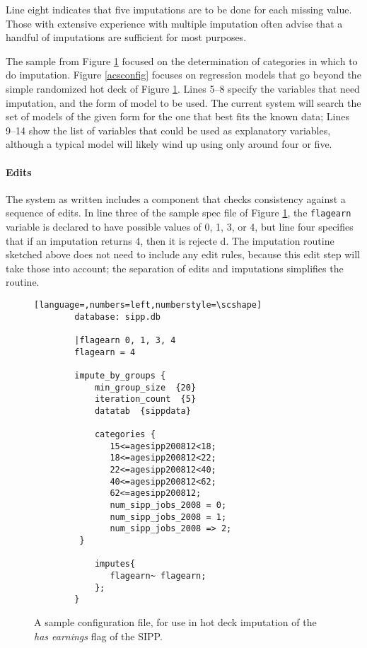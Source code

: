 \documentclass{article}
\begin{document}
        Line eight indicates that five imputations are to be done for each missing
        value. Those with extensive experience with multiple imputation often advise
        that a handful of imputations are sufficient for most purposes.

        The sample from
        Figure \ref{sippconfig} focused on the determination of categories in which to
        do imputation. Figure \ref{acsconfig} focuses on regression models that go
        beyond the simple randomized hot deck of Figure \ref{sippconfig}. Lines 5--8
        specify the variables that need imputation, and the form of model to be used.
        The current system will search the set of models of the given form for the one
        that best fits the known data; Lines 9--14 show the list of variables that could be
        used as explanatory variables, although a typical model will likely wind up
        using only around four or five.

     \paragraph{Edits} The system as written includes a component that checks consistency
        against a sequence of edits. In line three of the sample spec file of Figure
        \ref{sippconfig}, the {\tt flagearn} variable is declared to have possible values of 0,
        1, 3, or 4, but line four specifies that if an imputation returns 4, then it is rejecte
d.
        The imputation routine sketched above does not need to include any edit rules, because
        this edit step will take those into account; the separation of edits and imputations
        simplifies the routine.
      \begin{figure}
        \begin{lstlisting}[language=,numbers=left,numberstyle=\scshape]
        database: sipp.db

        |flagearn 0, 1, 3, 4
        flagearn = 4

        impute_by_groups {
            min_group_size  {20}
            iteration_count  {5}
            datatab  {sippdata}

            categories {
               15<=agesipp200812<18;
               18<=agesipp200812<22;
               22<=agesipp200812<40;
               40<=agesipp200812<62;
               62<=agesipp200812;
               num_sipp_jobs_2008 = 0;
               num_sipp_jobs_2008 = 1;
               num_sipp_jobs_2008 => 2;
         }

            imputes{
               flagearn~ flagearn;
            };
        }
        \end{lstlisting}
        \caption{A sample configuration file, for use in hot deck imputation of the {\em
        has earnings} flag of the SIPP. }
        \label{sippconfig}
        \end{figure}
\end{document}
